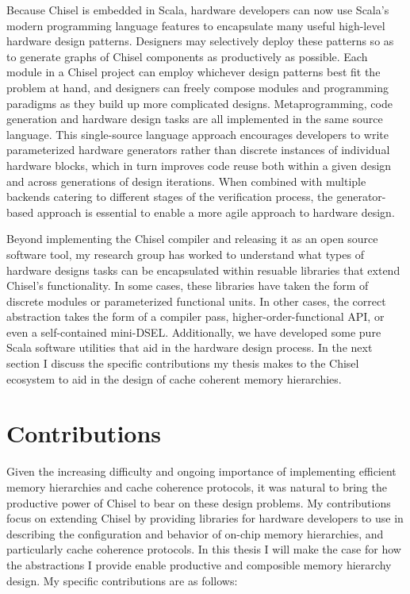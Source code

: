 Because Chisel is embedded in Scala, hardware developers can now use Scala's modern programming language features to encapsulate many useful high-level hardware design patterns.
Designers may selectively deploy these patterns so as to generate graphs of Chisel components as productively as possible.
Each module in a Chisel project can employ whichever design patterns best fit the problem at hand, and designers can freely compose modules and programming paradigms as they build up more complicated designs.
Metaprogramming, code generation and hardware design tasks are all implemented in the same source language.
This single-source language approach encourages developers to write parameterized hardware generators rather than discrete instances of individual hardware blocks,
which in turn improves code reuse both within a given design and across generations of design iterations.
When combined with multiple backends catering to different stages of the verification process, the generator-based approach is essential to enable a more agile approach to hardware design.

Beyond implementing the Chisel compiler and releasing it as an open source software tool, my research group has worked to understand what types of hardware designs tasks can be encapsulated within resuable libraries that extend Chisel's functionality.
In some cases, these libraries have taken the form of discrete modules or parameterized functional units.
In other cases, the correct abstraction takes the form of a compiler pass, higher-order-functional API, or even a self-contained mini-DSEL.
Additionally, we have developed some pure Scala software utilities that aid in the hardware design process.
In the next section I discuss the specific contributions my thesis makes to the Chisel ecosystem to aid in the design of cache coherent memory hierarchies.

\section{Contributions}

Given the increasing difficulty and ongoing importance of implementing efficient memory hierarchies and cache coherence protocols, it was natural to bring the productive power of Chisel to bear on these design problems.
My contributions focus on extending Chisel by providing libraries for hardware developers to use in describing the configuration and behavior of on-chip memory hierarchies, and particularly cache coherence protocols.
In this thesis I will make the case for how the abstractions I provide enable productive and composible memory hierarchy design.
My specific contributions are as follows:

